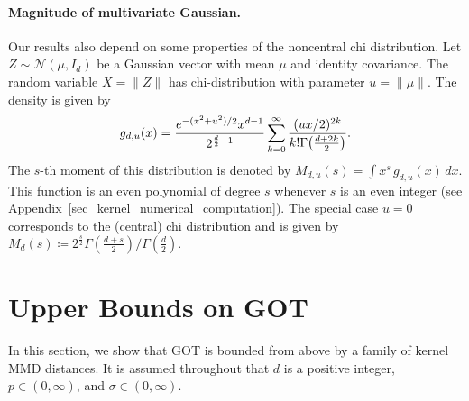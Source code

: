\documentclass{article}
\theoremstyle{definition}
\newcommand{\normal}{\mathcal{N}}
\newcommand{\appname}{Appendix}
\newcommand{\appname}{Supplement}
\let\originalleft\left
\let\originalright\right
\renewcommand{\left}{\mathopen{}\mathclose\bgroup\originalleft}
\renewcommand{\right}{\aftergroup\egroup\originalright}
\begin{document}
\paragraph{Magnitude of multivariate Gaussian.} 
Our results also depend on some properties of the noncentral chi distribution. Let $Z \sim \normal(\mu,I_d)$ be a Gaussian vector with mean $\mu$ and identity covariance. The random variable $X = \|Z\|$ has chi-distribution with parameter $u= \|\mu\|$. The density is given by
\begin{align}
    g_{d,u}(x) =\frac{e^{-(x^2+u^2)/2} x^{d-1}}{2^{\frac{d}{2} -1}}  \sum _{k=0}^{\infty }\frac{(ux/2)^{2k}}{k! \Gamma \left({\frac {d+2k}{2}}\right)}.
    \label{eq_chi_density}
\end{align}
The $s$-th moment of this distribution is denoted by  $M_{d,u}(s) = \int x^s \, g_{d,u}(x) \, dx$. This function is an even polynomial of degree $s$ whenever $s$ is an even integer (see \appname~\ref{sec_kernel_numerical_computation}).  The special case $u=0$ corresponds to the (central) chi distribution and is given by $M_{d} (s) \coloneqq  2^\frac{s}{2} \Gamma(\tfrac{d+s}{2}) / \Gamma(\tfrac{d}{2}).$


\section{Upper Bounds on GOT} 

In this section, we show that GOT is bounded from above by a family of kernel MMD distances. It is assumed throughout that $d$ is a positive integer, $p \in (0, \infty)$, and $\sigma \in (0, \infty)$.
\end{document}
